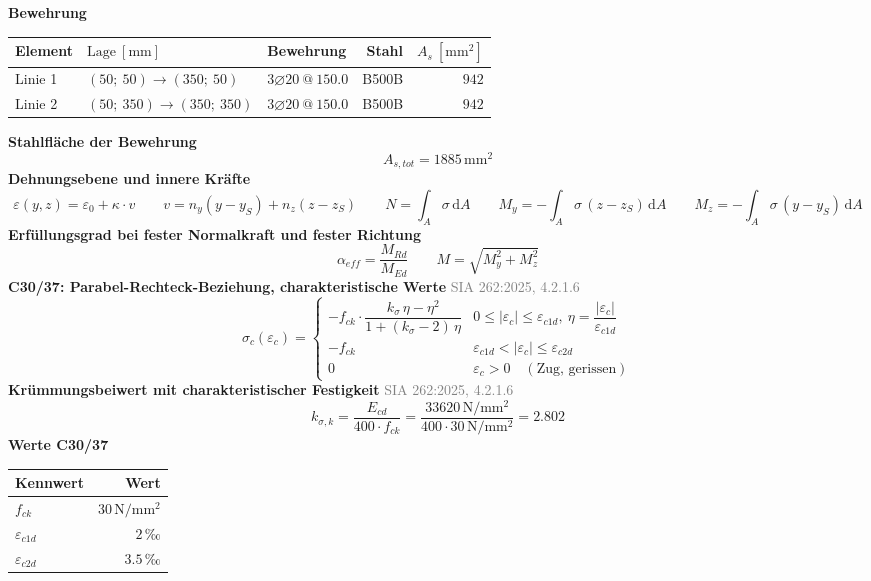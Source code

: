 \documentclass[11pt,a4paper]{article}
\newcommand{\normref}[1]{{\small\textcolor{gray}{#1}}}
\begin{document}
\noindent\textbf{Bewehrung}
\begin{longtable}{lllrr}
\hline
Element & $\text{Lage}\ [\mathrm{mm}]$ & Bewehrung & Stahl & $A_s\ [\mathrm{mm}^2]$ \\
\hline
\endhead
Linie 1 & $(50;\ 50) \rightarrow (350;\ 50)$ & $3 \varnothing 20\ @\ 150.0$ & B500B & $942$ \\
Linie 2 & $(50;\ 350) \rightarrow (350;\ 350)$ & $3 \varnothing 20\ @\ 150.0$ & B500B & $942$ \\
\hline
\end{longtable}
\noindent\textbf{Stahlfläche der Bewehrung}
\begin{equation*}
A_{s,tot} = 1885\,\mathrm{mm}^{2}
\end{equation*}
\noindent\textbf{Dehnungsebene und innere Kräfte}
\begin{equation*}
\varepsilon(y, z) = \varepsilon_0 + \kappa \cdot v \qquad v = n_y (y - y_S) + n_z (z - z_S) \qquad N = \int_A \sigma\,\mathrm{d}A \qquad M_y = -\int_A \sigma\,(z - z_S)\,\mathrm{d}A \qquad M_z = -\int_A \sigma\,(y - y_S)\,\mathrm{d}A
\end{equation*}
\noindent\textbf{Erfüllungsgrad bei fester Normalkraft und fester Richtung}
\begin{equation*}
\alpha_{eff} = \frac{M_{Rd}}{M_{Ed}} \qquad M = \sqrt{M_y^2 + M_z^2}
\end{equation*}
\noindent\textbf{C30/37: Parabel-Rechteck-Beziehung, charakteristische Werte} \hfill \normref{SIA 262:2025, 4.2.1.6}
\begin{equation*}
\sigma_c(\varepsilon_c) = \begin{cases} -f_{ck} \cdot \dfrac{k_\sigma\,\eta - \eta^2}{1 + (k_\sigma - 2)\,\eta} & 0 \le |\varepsilon_c| \le \varepsilon_{c1d},\ \eta = \dfrac{|\varepsilon_c|}{\varepsilon_{c1d}} \\[2ex] -f_{ck} & \varepsilon_{c1d} < |\varepsilon_c| \le \varepsilon_{c2d} \\[1ex] 0 & \varepsilon_c > 0 \quad (\text{Zug, gerissen}) \end{cases}
\end{equation*}
\noindent\textbf{Krümmungsbeiwert mit charakteristischer Festigkeit} \hfill \normref{SIA 262:2025, 4.2.1.6}
\begin{equation*}
k_{\sigma,k} = \frac{E_{cd}}{400 \cdot f_{ck}} = \frac{33620\,\mathrm{N}/\mathrm{mm}^{2}}{400 \cdot 30\,\mathrm{N}/\mathrm{mm}^{2}} = 2.802
\end{equation*}
\noindent\textbf{Werte C30/37}
\begin{longtable}{lr}
\hline
Kennwert & Wert \\
\hline
\endhead
$f_{ck}$ & $30\,\mathrm{N}/\mathrm{mm}^{2}$ \\
$\varepsilon_{c1d}$ & $2\,\text{‰}$ \\
$\varepsilon_{c2d}$ & $3.5\,\text{‰}$ \\
\hline
\end{longtable}
\end{document}

